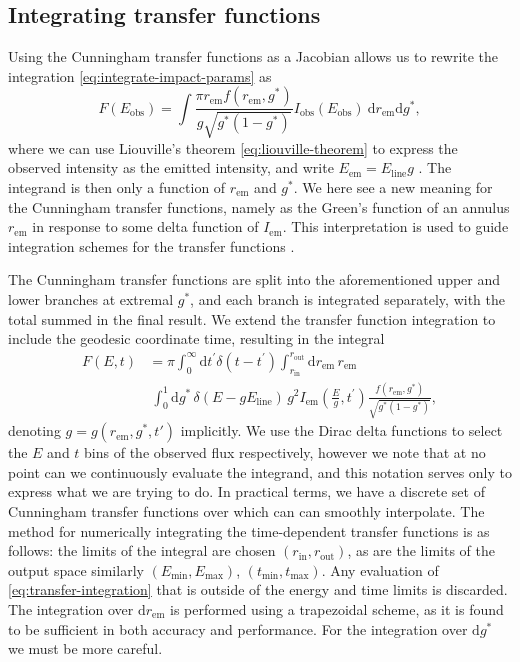\documentclass[fleqn,usenatbib]{mnras}
\renewcommand{\d}{\text{d}}
\begin{document}
\subsection{Integrating transfer functions}
\label{sec:transfer-function-integration}

Using the Cunningham transfer functions as a Jacobian allows us to rewrite the
integration \eqref{eq:integrate-impact-params} as
\begin{equation}
    F(E_\text{obs}) = \int \frac{\pi r_\text{em} f(r_\text{em}, g^\ast)}{g \sqrt{g^\ast (1 - g^\ast)}}
    I_\text{obs}(E_\text{obs}) \ \d r_\text{em} \d g^\ast,
\end{equation}
where we can use Liouville's theorem \eqref{eq:liouville-theorem} to express the
observed intensity as the emitted intensity, and write $E_\text{em} =
E_\text{line}g$ . The integrand is then only a function of $r_\text{em}$ and
$g^\ast$. We here see a new meaning for the Cunningham transfer functions,
namely as the Green's function of an annulus $r_\text{em}$ in response to some
delta function of $I_\text{em}$. This interpretation is used to guide
integration schemes for the transfer functions \citep{dauser_broad_2010}.

The Cunningham transfer functions are split into the aforementioned
upper and lower branches at extremal $g^\ast$, and each branch is integrated
separately, with the total summed in the final result. We extend the transfer
function integration to include the geodesic coordinate time, resulting in the
integral
\begin{align}
    \label{eq:transfer-integration}
    F(E, t) &=
    \pi
    \int_0^\infty \d t^\prime \delta(t - t^\prime)
    \int_{r_\text{in}}^{r_\text{out}} \d r_\text{em}\,r_\text{em} \nonumber \\
    &\ \int_0^1 \d g^\ast\, \delta(E - gE_\text{line})\, g^2 I_\text{em}\left(\frac{E}{g}, t^\prime\right) \frac{f(r_\text{em}, g^\ast)}{\sqrt{g^\ast (1 - g^\ast)}},
\end{align}
denoting $g = g( r_\text{em}, g^\ast, t')$ implicitly. We use the Dirac delta
functions to select the $E$ and $t$ bins of the observed flux respectively,
however we note that at no point can we continuously evaluate the integrand, and
this notation serves only to express what we are trying to do. In practical
terms, we have a discrete set of Cunningham transfer functions over which can
can smoothly interpolate. The method for numerically integrating the
time-dependent transfer functions is as follows: the limits of the integral are
chosen $(r_\text{in}, r_\text{out})$, as are the limits of the output space
similarly $(E_\text{min}, E_\text{max})$, $(t_\text{min}, t_\text{max})$. Any
evaluation of \eqref{eq:transfer-integration} that is outside of the energy and
time limits is discarded. The integration over $\d r_\text{em}$ is performed
using a trapezoidal scheme, as it is found to be sufficient in both accuracy and
performance. For the integration over $\d g^\ast$ we must be more careful.
\end{document}
